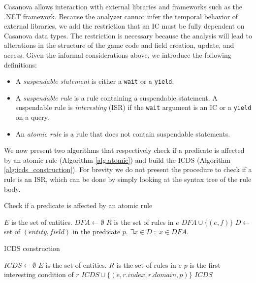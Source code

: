 Casanova allows interaction with external libraries and frameworks such as the .NET framework. Because the analyzer cannot infer the temporal behavior of external libraries, we add the restriction that an IC must be fully dependent on Casanova data types. The restriction is necessary because the analysis will lead to alterations in the structure of the game code and field creation, update, and access. Given the informal considerations above, we introduce the following definitions:
\begin{itemize}
\item A \textit{suspendable statement} is either a \texttt{wait} or a \texttt{yield};
\item A \textit{suspendable rule} is a rule containing a suspendable statement. A suspendable rule is \textit{interesting} (ISR) if the \texttt{wait} argument is an IC or a \texttt{yield} on a query.
\item An \textit{atomic rule} is a rule that does not contain suspendable statements.
\end{itemize}

We now present two algorithms that respectively check if a predicate is affected by an atomic rule (Algorithm \ref{alg:atomic}) and build the ICDS (Algorithm \ref{alg:icds_construction}). For brevity we do not present the procedure to check if a rule is an ISR, which can be done by simply looking at the syntax tree of the rule body.


\begin{algorithm}
	
\caption{Check if a predicate is affected by an atomic rule}

\label{alg:atomic}
\begin{algorithmic}
    \State $E$ is the set of entities.
    \State $DFA \gets \emptyset$
        \State $R$ is the set of rules in $e$
                    \State $DFA \cup \lbrace (e,f) \rbrace$
                \EndFor
            \EndIf
        \EndFor
    \EndFor
    \State $D \gets$ set of $(entity,field)$ in the predicate $p$.
    \State \Return $\exists x \in D \; : \; x \in DFA$.
\EndFunction
\end{algorithmic}
\end{algorithm}

\begin{algorithm}
\caption{ICDS construction}

\label{alg:icds_construction}
\begin{algorithmic}
    \State $ICDS \gets \emptyset$
    \State $E$ is the set of entities.
        \State $R$ is the set of rules in $e$
                \State $p$ is the first interesting condition of $r$
                    \State $ICDS \cup \lbrace (e,r.index,r.domain,p) \rbrace$
                \EndIf
            \EndIf
        \EndFor
    \EndFor
    \State \Return $ICDS$
\EndFunction
\end{algorithmic}
\end{algorithm}


